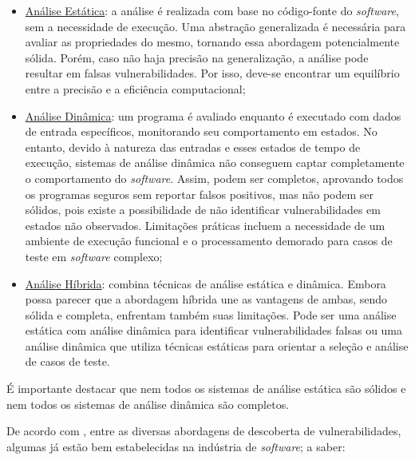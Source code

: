         \begin{itemize}
            \item \underline{Análise Estática}: a análise é realizada com base no código-fonte do \textit{software}, sem a necessidade de execução. Uma abstração generalizada é necessária para avaliar as propriedades do mesmo, tornando essa abordagem potencialmente sólida. Porém, caso não haja precisão na generalização, a análise pode resultar em falsas vulnerabilidades. Por isso, deve-se encontrar um equilíbrio entre a precisão e a eficiência computacional;
            \item \underline{Análise Dinâmica}: um programa é avaliado enquanto é executado com dados de entrada específicos, monitorando seu comportamento em estados. No entanto, devido à natureza das entradas e esses estados de tempo de execução, sistemas de análise dinâmica não conseguem captar completamente o comportamento do \textit{software}. Assim, podem ser completos, aprovando todos os programas seguros sem reportar falsos positivos, mas não podem ser sólidos, pois existe a possibilidade de não identificar vulnerabilidades em estados não observados. Limitações práticas incluem a necessidade de um ambiente de execução funcional e o processamento demorado para casos de teste em \textit{software} complexo;
            \item \underline{Análise Híbrida}: combina técnicas de análise estática e dinâmica. Embora possa parecer que a abordagem híbrida une as vantagens de ambas, sendo sólida e completa, enfrentam também suas limitações. Pode ser uma análise estática com análise dinâmica para identificar vulnerabilidades falsas ou uma análise dinâmica que utiliza técnicas estáticas para orientar a seleção e análise de casos de teste.
        \end{itemize}
        
        É importante destacar que nem todos os sistemas de análise estática são sólidos e nem todos os sistemas de análise dinâmica são completos.
        
        De acordo com , entre as diversas abordagens de descoberta de vulnerabilidades, algumas já estão bem estabelecidas na indústria de \textit{software}; a saber:
        
